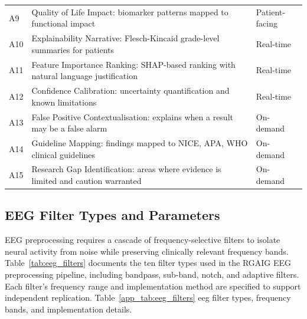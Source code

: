 {\begin{xltabular}{\textwidth}{@{}l X l@{}}
A9 & Quality of Life Impact: biomarker patterns mapped to functional impact & Patient-facing \\[1pt]
A10 & Explainability Narrative: Flesch-Kincaid grade-level summaries for patients & Real-time \\[1pt]
A11 & Feature Importance Ranking: SHAP-based ranking with natural language justification & Real-time \\[1pt]
A12 & Confidence Calibration: uncertainty quantification and known limitations & Real-time \\[1pt]
A13 & False Positive Contextualisation: explains when a result may be a false alarm & On-demand \\[1pt]
A14 & Guideline Mapping: findings mapped to NICE, APA, WHO clinical guidelines & On-demand \\[1pt]
A15 & Research Gap Identification: areas where evidence is limited and caution warranted & On-demand \\
\end{xltabular}}

\subsection{EEG Filter Types and Parameters}

EEG preprocessing requires a cascade of frequency-selective filters to isolate neural activity from noise while preserving clinically relevant frequency bands. Table~\ref{tab:eeg_filters} documents the ten filter types used in the RGAIG EEG preprocessing pipeline, including bandpass, sub-band, notch, and adaptive filters. Each filter's frequency range and implementation method are specified to support independent replication.
\noindent Table~\ref{app_tab:eeg_filters} eeg filter types, frequency bands, and implementation details.

